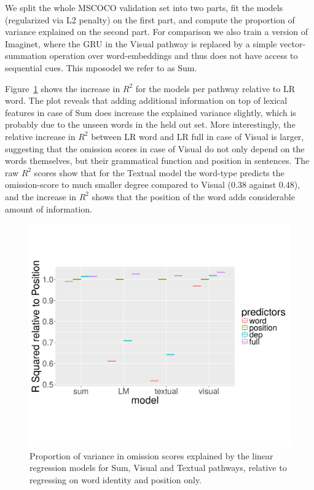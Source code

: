 \noindent We split the whole MSCOCO validation set into two parts, fit the 
models (regularized via L2 penalty) on the first part, and compute the 
proportion of variance explained on the second part. 
For comparison we also train a version of {\sc Imaginet},
where the GRU in the {\sc Visual} pathway is replaced by a simple vector-summation operation
over word-embeddings and thus does not have access to sequential cues. This
mposodel we refer to as {\sc Sum}. 

Figure~\ref{fig:rsquared} shows the increase in $R^2$  for the models 
per pathway relative to {\sc LR word}. The plot reveals that 
adding additional information on top of lexical features in case of {\sc Sum} 
does increase the explained variance slightly, which is probably due to 
the unseen words in the held out set. More interestingly, the
relative increase in $R^2$ between {\sc LR word} and {\sc LR full} in
case of {\sc Visual} is larger, suggesting that 
the omission scores in case of {\sc Visual} do not only depend on the words themselves,
but their grammatical function and position in sentences.  The raw  $R^2$
scores show that for the {\sc Textual} model the word-type predicts the omission-score
to much smaller degree compared to {\sc Visual} (0.38 against 0.48), and the 
increase in $R^2$ shows that the position of the word adds considerable 
amount of information. 

\begin{figure}
\centering
  \includegraphics[scale=0.35]{position-new.png}
\caption{Proportion of variance in omission scores explained by the
  linear regression models
 for {\sc Sum}, {\sc Visual} and {\sc Textual} pathways, relative to
 regressing on word identity and position only. }
\label{fig:rsquared}
\end{figure}


